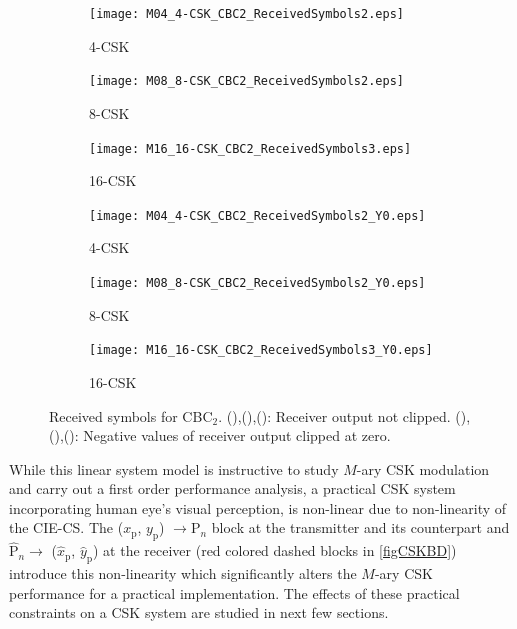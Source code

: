 \documentclass[10pt,letterpaper]{article}
\begin{document}
\begin{figure}[t]
	\centering
		\begin{subfigure}{0.32\textwidth}
		\centering
			\texttt{[image: M04\_4-CSK\_CBC2\_ReceivedSymbols2.eps]}
			\caption{4-CSK}
			\label{fig4RcvSym}
		\end{subfigure}
		\begin{subfigure}{0.32\textwidth}
		\centering
			\texttt{[image: M08\_8-CSK\_CBC2\_ReceivedSymbols2.eps]}
			\caption{8-CSK}
			\label{fig8RcvSym}
		\end{subfigure}
		\begin{subfigure}{0.32\textwidth}
		\centering
			\texttt{[image: M16\_16-CSK\_CBC2\_ReceivedSymbols3.eps]}
			\caption{16-CSK}
			\label{fig16RcvSym}
		\end{subfigure}
		\begin{subfigure}{0.32\textwidth}
		\centering
			\texttt{[image: M04\_4-CSK\_CBC2\_ReceivedSymbols2\_Y0.eps]}
			\caption{4-CSK}
			\label{fig4RcvSymY0}
		\end{subfigure}
		\begin{subfigure}{0.32\textwidth}
		\centering
			\texttt{[image: M08\_8-CSK\_CBC2\_ReceivedSymbols2\_Y0.eps]}
			\caption{8-CSK}
			\label{fig8RcvSymY0}
		\end{subfigure}
		\begin{subfigure}{0.32\textwidth}
		\centering
			\texttt{[image: M16\_16-CSK\_CBC2\_ReceivedSymbols3\_Y0.eps]}
			\caption{16-CSK}
			\label{fig16RcvSymY0}
		\end{subfigure}
	\caption{Received symbols for CBC$_{2}$. (),(),(): Receiver output not clipped. (),(),(): Negative values of receiver output clipped at zero.}
	\label{figRcvSym}
\end{figure}

While this linear system model is instructive to study $M$-ary CSK modulation
and carry out a first order performance analysis, a practical CSK
system incorporating human eye's visual perception, is non-linear due to non-linearity of the CIE-CS. The ($x_{\text{p}}$, $y_{\text{p}}$) $\rightarrow  \text{P}_{n}$ block at the transmitter and its counterpart and $\hat{\text{P}}_{n}\rightarrow$ ($\hat{x}_{\text{p}}$, $\hat{y}_{\text{p}}$) at the receiver (red colored dashed
blocks in \figurename{ }\ref{figCSKBD}) introduce this non-linearity
which significantly alters the $M$-ary CSK performance for a practical
implementation. The effects of these practical constraints on a CSK
system are studied in next few sections.
\end{document}
